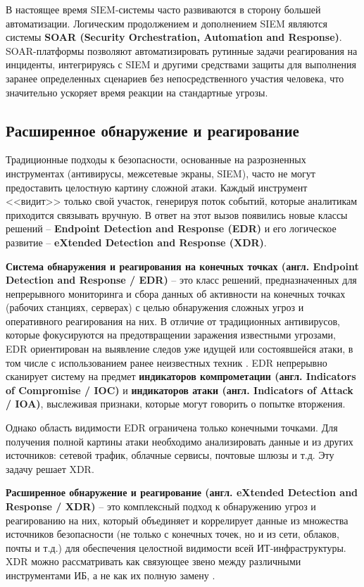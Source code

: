 В настоящее время SIEM-системы часто развиваются в сторону большей автоматизации. Логическим продолжением и дополнением SIEM являются системы \textbf{SOAR (Security Orchestration, Automation and Response)}. SOAR-платформы позволяют автоматизировать рутинные задачи реагирования на инциденты, интегрируясь с SIEM и другими средствами защиты для выполнения заранее определенных сценариев без непосредственного участия человека, что значительно ускоряет время реакции на стандартные угрозы.

\subsection{Расширенное обнаружение и реагирование}

Традиционные подходы к безопасности, основанные на разрозненных инструментах (антивирусы, межсетевые экраны, SIEM), часто не могут предоставить целостную картину сложной атаки. Каждый инструмент <<видит>> только свой участок, генерируя поток событий, которые аналитикам приходится связывать вручную. В ответ на этот вызов появились новые классы решений -- \textbf{Endpoint Detection and Response (EDR)} и его логическое развитие -- \textbf{eXtended Detection and Response (XDR)}.

\textbf{Система обнаружения и реагирования на конечных точках (англ. Endpoint Detection and Response / EDR)} -- это класс решений, предназначенных для непрерывного мониторинга и сбора данных об активности на конечных точках (рабочих станциях, серверах) с целью обнаружения сложных угроз и оперативного реагирования на них. В отличие от традиционных антивирусов, которые фокусируются на предотвращении заражения известными угрозами, EDR ориентирован на выявление следов уже идущей или состоявшейся атаки, в том числе с использованием ранее неизвестных техник \cite{KasperskyEDR}. EDR непрерывно сканирует систему на предмет \textbf{индикаторов компрометации (англ. Indicators of Compromise / IOC)} и \textbf{индикаторов атаки (англ. Indicators of Attack / IOA)}, выслеживая признаки, которые могут говорить о попытке вторжения.

Однако область видимости EDR ограничена только конечными точками. Для получения полной картины атаки необходимо анализировать данные и из других источников: сетевой трафик, облачные сервисы, почтовые шлюзы и т.д. Эту задачу решает XDR.

\textbf{Расширенное обнаружение и реагирование (англ. eXtended Detection and Response / XDR)} -- это комплексный подход к обнаружению угроз и реагированию на них, который объединяет и коррелирует данные из множества источников безопасности (не только с конечных точек, но и из сети, облаков, почты и т.д.) для обеспечения целостной видимости всей ИТ-инфраструктуры. XDR можно рассматривать как связующее звено между различными инструментами ИБ, а не как их полную замену \cite{PositiveTechnologiesXDR}.

